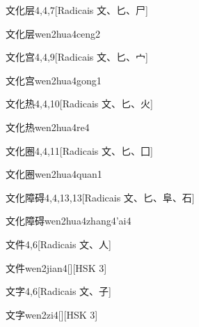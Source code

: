\begin{entry}{文化层}{4,4,7}[Radicais ⽂、⼔、⼫]
  \begin{phonetics}{文化层}{wen2hua4ceng2}
  \end{phonetics}
\end{entry}

\begin{entry}{文化宫}{4,4,9}[Radicais ⽂、⼔、⼧]
  \begin{phonetics}{文化宫}{wen2hua4gong1}
  \end{phonetics}
\end{entry}

\begin{entry}{文化热}{4,4,10}[Radicais ⽂、⼔、⽕]
  \begin{phonetics}{文化热}{wen2hua4re4}
  \end{phonetics}
\end{entry}

\begin{entry}{文化圈}{4,4,11}[Radicais ⽂、⼔、⼞]
  \begin{phonetics}{文化圈}{wen2hua4quan1}
  \end{phonetics}
\end{entry}

\begin{entry}{文化障碍}{4,4,13,13}[Radicais ⽂、⼔、⾩、⽯]
  \begin{phonetics}{文化障碍}{wen2hua4zhang4'ai4}
  \end{phonetics}
\end{entry}

\begin{entry}{文件}{4,6}[Radicais ⽂、⼈]
  \begin{phonetics}{文件}{wen2jian4}[][HSK 3]
  \end{phonetics}
\end{entry}

\begin{entry}{文字}{4,6}[Radicais ⽂、⼦]
  \begin{phonetics}{文字}{wen2zi4}[][HSK 3]
  \end{phonetics}
\end{entry}

